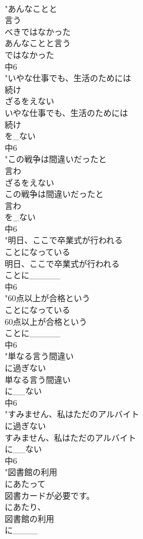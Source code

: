 \documentclass[8pt]{extreport}
\begin{document}
\begin{CJK}{UTF8}{min}
\\	"あんなことと
\\	言う
\\	べきではなかった
\\	あんなことと言う
\\	ではなかった
\\	中6
\\	"いやな仕事でも、生活のためには
\\	続け
\\	ざるをえない
\\	いやな仕事でも、生活のためには
\\	続け
\\	を_ない
\\	中6
\\	"この戦争は間違いだったと
\\	言わ
\\	ざるをえない
\\	この戦争は間違いだったと
\\	言わ
\\	を_ない
\\	中6
\\	"明日、ここで卒業式が行われる
\\	ことになっている
\\	明日、ここで卒業式が行われる
\\	ことに_____
\\	中6
\\	"60点以上が合格という
\\	ことになっている
\\	60点以上が合格という
\\	ことに_____
\\	中6
\\	"単なる言う間違い
\\	に過ぎない
\\	単なる言う間違い
\\	に__ない
\\	中6
\\	"すみません、私はただのアルバイト
\\	に過ぎない
\\	すみません、私はただのアルバイト
\\	に__ない
\\	中6
\\	"図書館の利用
\\	にあたって
\\	図書カードが必要です。
\\	にあたり、
\\	図書館の利用
\\	に____

\end{CJK}
\end{document}
